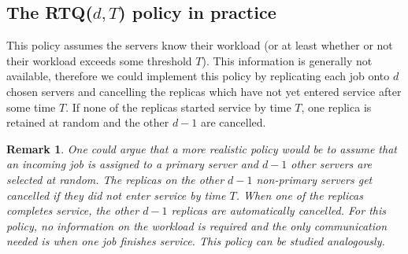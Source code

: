 \documentclass[12pt]{report}
\newtheorem{remark}{Remark}
\begin{document}
\subsection*{The RTQ($d,T$) policy in practice}
This policy assumes the servers know their workload (or at least whether or not their workload exceeds some threshold $T$). This information is generally not available, therefore we could implement this policy by replicating each job onto $d$ chosen servers and cancelling the
replicas which have not yet entered service after some time $T$. If none of the replicas started service by time $T$, one replica is retained at random and the other $d-1$ are cancelled. 
\begin{remark}
One could argue that a more realistic policy would be to assume that an incoming job is assigned to a primary server and $d-1$ other servers are selected at random. The replicas on the other $d-1$ non-primary servers get cancelled if they did not enter service by time $T$. When one of the replicas completes service, the other $d-1$ replicas are automatically cancelled. For this policy, no information on the workload is required and the only communication needed is when one job finishes service. This policy can be studied analogously.
\end{remark}
\end{document}
